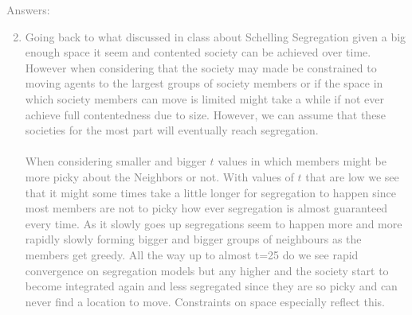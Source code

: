 \documentclass[11pt]{article}
\begin{document}
	\textcolor{gray}{
	Answers:
	\begin{enumerate} 
	\setcounter{enumi}{1} 
		\item Going back to what discussed in class about Schelling Segregation given a big enough space it seem and contented society can be achieved over time.  However when considering that the society may made be constrained to moving agents to the largest groups of society members or if the space in which society members can move is limited might take a while if not ever achieve full contentedness due to size.  However, we can assume that these societies for the most part will eventually reach segregation.\\\\
When considering smaller and bigger $t$ values in which members might be more picky about the Neighbors or not.  With values of $t$ that are low we see that it might some times take a little longer for segregation to happen since most members are not to picky how ever segregation is almost guaranteed every time.  As it slowly goes up segregations seem to happen more and more rapidly slowly forming bigger and bigger groups of neighbours as the members get greedy.  All the way up to almost t=25 do we see rapid convergence on segregation models but any higher and the society start to become integrated again and less segregated since they are so picky and can never find a location to move. Constraints on space especially reflect this. 
	\end {enumerate}}
\end{document}
